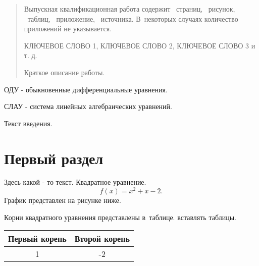 \documentclass{bacgost}
\begin{document}
\begin{abstract}
Выпускная квалификационная работа содержит \pageref*{LastPage}~страниц, ~рисунок, ~таблиц, ~приложение, ~источника. В~некоторых случаях количество приложений не указывается.

КЛЮЧЕВОЕ СЛОВО 1, КЛЮЧЕВОЕ СЛОВО 2, КЛЮЧЕВОЕ СЛОВО 3 и т. д.

Краткое описание работы.
\end{abstract}


\gosttableofcontents


\begin{lofab}
ОДУ - обыкновенные дифференциальные уравнения.

СЛАУ - система линейных алгебраических уравнений.
\end{lofab}


Текст введения.


\mainpart


\section{Первый раздел}
Здесь какой - то текст. Квадратное уравнение.
\begin{equation}
f(x) = x^2 + x-2.
\end{equation}
График представлен на рисунке ниже.
\begin{gostfigure}
\begin{center} 
\end{center}
\end{gostfigure}

Корни квадратного уравнения представлены в~таблице. вставлять таблицы.
\begin{gosttable}
\begin{center} 
\begin{tabular}{|c|c|}
\hline 
Первый корень &  Второй корень \\ 
\hline 
1 & -2  \\ 
\hline 
\end{tabular} 
\end{center}
\end{gosttable}
\end{document}
